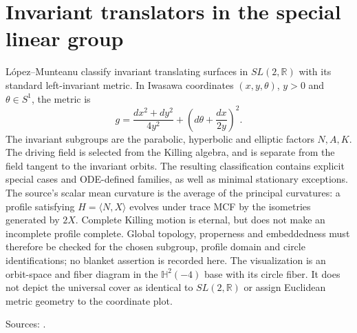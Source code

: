 \chapter{Invariant translators in the special linear group}\label{sec:catalogue-sl2-invariant-translators}
\begin{example}\label{ex:catalogue-sl2-invariant-translators}
L\'opez--Munteanu classify invariant translating surfaces in $SL(2,\mathbb R)$ with its standard left-invariant metric. In Iwasawa coordinates $(x,y,\theta)$, $y>0$ and $\theta\in S^1$, the metric is
\[
 g=\frac{dx^2+dy^2}{4y^2}+\left(d\theta+\frac{dx}{2y}\right)^2.
\]
The invariant subgroups are the parabolic, hyperbolic and elliptic factors $N,A,K$. The driving field is selected from the Killing algebra, and is separate from the field tangent to the invariant orbits. The resulting classification contains explicit special cases and ODE-defined families, as well as minimal stationary exceptions.
The source's scalar mean curvature is the average of the principal curvatures: a profile satisfying $H=\langle N,X\rangle$ evolves under trace MCF by the isometries generated by $2X$. Complete Killing motion is eternal, but does not make an incomplete profile complete. Global topology, properness and embeddedness must therefore be checked for the chosen subgroup, profile domain and circle identifications; no blanket assertion is recorded here. The visualization is an orbit-space and fiber diagram in the $\mathbb H^2(-4)$ base with its circle fiber. It does not depict the universal cover as identical to $SL(2,\mathbb R)$ or assign Euclidean metric geometry to the coordinate plot.
\par Sources: \cite{CatLopezMunteanu2024}.
\end{example}

